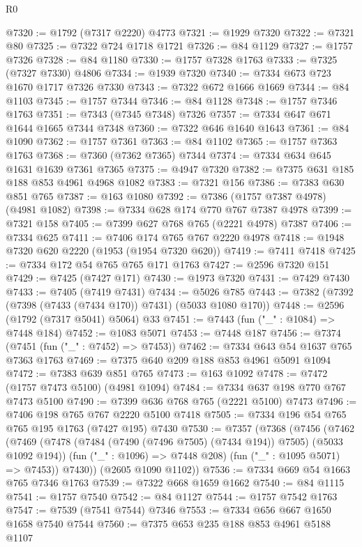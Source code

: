 \begin{lexlean}{R0}
\begin{coremodule}
{{{{{@7320 := @1792 (@7317 @2220) @4773
@7321 := @1929 @7320
@7322 := @7321 @80
@7325 := @7322 @724 @1718 @1721
@7326 := @84 @1129
@7327 := @1757 @7326
@7328 := @84 @1180
@7330 := @1757 @7328 @1763
@7333 := @7325 (@7327 @7330) @4806
@7334 := @1939 @7320
@7340 := @7334 @673 @723 @1670 @1717 @7326 @7330
@7343 := @7322 @672 @1666 @1669
@7344 := @84 @1103
@7345 := @1757 @7344
@7346 := @84 @1128
@7348 := @1757 @7346 @1763
@7351 := @7343 (@7345 @7348) @7326
@7357 := @7334 @647 @671 @1644 @1665 @7344 @7348
@7360 := @7322 @646 @1640 @1643
@7361 := @84 @1090
@7362 := @1757 @7361
@7363 := @84 @1102
@7365 := @1757 @7363 @1763
@7368 := @7360 (@7362 @7365) @7344
@7374 := @7334 @634 @645 @1631 @1639 @7361 @7365
@7375 := @4947 @7320
@7382 := @7375 @631 @185 @188 @853 @4961 @4968 @1082
@7383 := @7321 @156
@7386 := @7383 @630 @851 @765
@7387 := @163 @1080
@7392 := @7386 (@1757 @7387 @4978) (@4981 @1082)
@7398 := @7334 @628 @174 @770 @767 @7387 @4978
@7399 := @7321 @158
@7405 := @7399 @627 @768 @765 (@2221 @4978) @7387
@7406 := @7334 @625
@7411 := @7406 @174 @765 @767 @2220 @4978
@7418 := @1948 @7320 @620 @2220 (@1953 (@1954 @7320 @620))
@7419 := @7411 @7418
@7425 := @7334 @172 @54 @765 @765 @171 @1763
@7427 := @2596 @7320 @151
@7429 := @7425 (@7427 @171)
@7430 := @1973 @7320
@7431 := @7429 @7430
@7433 := @7405 (@7419 @7431)
@7434 := @5026 @785
@7443 := @7382 (@7392 (@7398 (@7433 (@7434 @170)) @7431) (@5033 @1080 @170))
@7448 := @2596 (@1792 (@7317 @5041) @5064) @33
@7451 := @7443 (fun ("_" : @1084) => @7448 @184)
@7452 := @1083 @5071
@7453 := @7448 @187
@7456 := @7374 (@7451 (fun ("_" : @7452) => @7453))
@7462 := @7334 @643 @54 @1637 @765 @7363 @1763
@7469 := @7375 @640 @209 @188 @853 @4961 @5091 @1094
@7472 := @7383 @639 @851 @765
@7473 := @163 @1092
@7478 := @7472 (@1757 @7473 @5100) (@4981 @1094)
@7484 := @7334 @637 @198 @770 @767 @7473 @5100
@7490 := @7399 @636 @768 @765 (@2221 @5100) @7473
@7496 := @7406 @198 @765 @767 @2220 @5100 @7418
@7505 := @7334 @196 @54 @765 @765 @195 @1763 (@7427 @195) @7430
@7530 := @7357
    (@7368
      (@7456
        (@7462
          (@7469
            (@7478 (@7484 (@7490 (@7496 @7505) (@7434 @194)) @7505) (@5033 @1092 @194))
            (fun ("_" : @1096) => @7448 @208)
            (fun ("_" : @1095 @5071) => @7453))
          @7430))
      (@2605 @1090 @1102))
@7536 := @7334 @669 @54 @1663 @765 @7346 @1763
@7539 := @7322 @668 @1659 @1662
@7540 := @84 @1115
@7541 := @1757 @7540
@7542 := @84 @1127
@7544 := @1757 @7542 @1763
@7547 := @7539 (@7541 @7544) @7346
@7553 := @7334 @656 @667 @1650 @1658 @7540 @7544
@7560 := @7375 @653 @235 @188 @853 @4961 @5188 @1107
}}}}}
\end{coremodule}
\end{lexlean}
